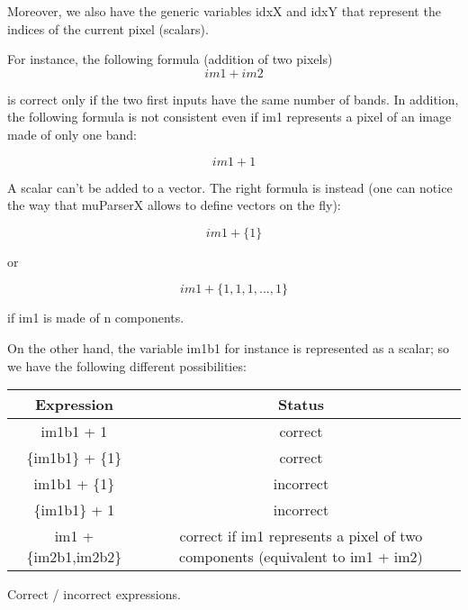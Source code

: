 Moreover, we also have the generic variables idxX and idxY that represent 
the indices of the current pixel (scalars). 


\begin{center}
\end{center}

For instance, the following formula (addition of two pixels)
\begin{equation}
  im1+im2
\end{equation}
\label{firstequation}

is correct only if the two first inputs have the same number of bands. 
In addition, the following formula is not consistent even if im1 
represents a pixel of an image made of only one band:

\begin{equation}
  im1+1
\end{equation}

A scalar can't be added to a vector. The right formula is instead 
(one can notice the way that muParserX allows to define vectors on the fly):

\begin{equation}
  im1+\{ 1 \}
\end{equation}

or

\begin{equation}
  im1 + \{1,1,1,...,1\}
\end{equation}

if im1 is made of n components. 

On the other hand, the variable im1b1 for instance is represented as a 
scalar; so we have the following different possibilities:

\begin{center} 
\begin{tabular}{||c|c||}
\hline
\bf Expression & \bf Status \\
\hline\hline
im1b1 + 1 & correct \\
\{im1b1\} + \{1\} & correct \\
im1b1 + \{1\} & incorrect \\
\{im1b1\} + 1 & incorrect \\
im1 + \{im2b1,im2b2\} & correct if im1 represents a pixel of two components (equivalent to  im1 + im2) \\
\hline
\end{tabular}
\end{center}
\caption{Correct / incorrect expressions.}
\label{correctness}


